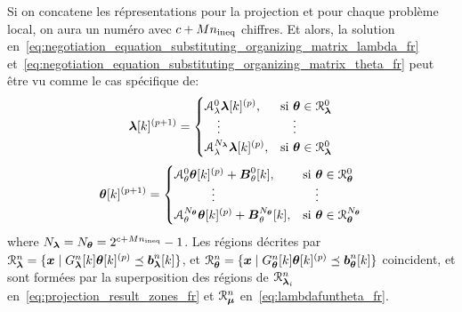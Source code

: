 \documentclass[../main.tex]{subfiles}
\begin{document}
Si on concatene les répresentations pour la projection et pour chaque problème local, on aura un numéro avec $c+Mn_{\text{ineq}}$ chiffres.
Et alors, la solution en~\eqref{eq:negotiation_equation_substituting_organizing_matrix_lambda_fr} et~\eqref{eq:negotiation_equation_substituting_organizing_matrix_theta_fr} peut être vu comme le cas spécifique de:
\begin{equation}
  \label{eq:negotiation_equation_substituting_organizing_matrix_lambda_switched_fr}
  \vec{\lambda}[k]\pplusone=
  \begin{cases}
    \mathcal{A}_{\lambda}^{0}\vec{\lambda}[k]\p,&\text{si}\ \vec{\theta} \in \set{R}_{\vec{\lambda}}^{0}\\
    \quad\vdots&\quad\vdots\\
    \mathcal{A}_{\lambda}^{N_{\vec{\lambda}}}\vec{\lambda}[k]\p,&\text{si}\ \vec{\theta}\in\set{R}_{\vec{\lambda}}^{0}\\
  \end{cases}
\end{equation}
\begin{equation}
  \label{eq:negotiation_equation_substituting_organizing_matrix_theta_switched_fr}
  \vec{\theta}[k]\pplusone=
  \begin{cases}
    \mathcal{A}_{\theta}^{0}\vec{\theta}[k]\p+\mathcal{\vec{B}}_{\theta}^{0}[k],&\text{si}\ \vec{\theta}\in\set{R}_{\vec{\theta}}^{0}\\
    \qquad\quad \vdots&\quad \vdots\\
    \mathcal{A}_{\theta}^{N_{\vec{\theta}}}\vec{\theta}[k]\p+\mathcal{\vec{B}}_{\theta}^{N_{\vec{\theta}}}[k],&\text{si}\ \vec{\theta}\in\set{R}_{\vec{\theta}}^{N_{\vec{\theta}}}\\
  \end{cases}
\end{equation}
where $N_{\boldsymbol{\lambda}}=N_{\boldsymbol{\theta}}=2^{c+Mn_{\text{ineq}}}-1$.
Les régions décrites par ${\mathcal{R}_{\boldsymbol{\lambda}}^{n}=\{\boldsymbol{x}\mid G_{\boldsymbol{\lambda}}^{n}[k]\boldsymbol{\theta}[k]^{(p)} \preceq \boldsymbol{b}_{\boldsymbol{\lambda}}^{n}[k]\}}$, et
 ${\mathcal{R}_{\boldsymbol{\theta}}^{n}=\{\boldsymbol{x}\mid G_{\boldsymbol{\theta}}^{n}[k]\boldsymbol{\theta}[k]^{(p)} \preceq \boldsymbol{b}_{\boldsymbol{\theta}}^{n}[k]\}}$
coincident, et sont formées par la superposition des régions de $\mathcal{R}_{\boldsymbol{\lambda}_{i}}^{n}$ en~\eqref{eq:projection_result_zones_fr} et $\mathcal{R}_{\boldsymbol{\mu}}^{n}$ en~\eqref{eq:lambdafuntheta_fr}.
\end{document}
